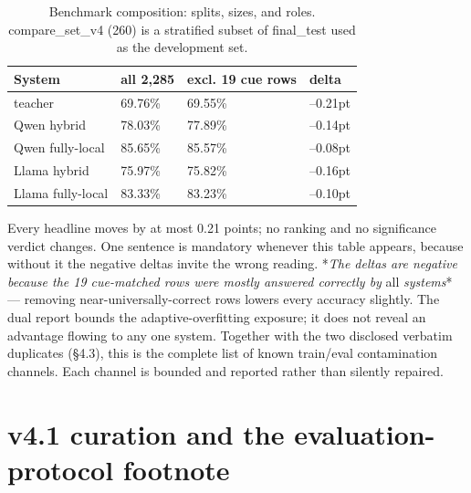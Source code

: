 \documentclass[10pt]{article} %
\begin{document}
\begin{table}[t]
\centering
\small
\caption{Benchmark composition: splits, sizes, and roles. compare\_set\_v4 (260) is a stratified subset of final\_test used as the development set.}
\label{tab:04_benchmark_1}
\begin{tabular}{llll}
\toprule
System & all 2,285 & excl. 19 cue rows & delta \\
\midrule
teacher & 69.76\% & 69.55\% & --0.21pt \\
Qwen hybrid & 78.03\% & 77.89\% & --0.14pt \\
Qwen fully-local & 85.65\% & 85.57\% & --0.08pt \\
Llama hybrid & 75.97\% & 75.82\% & --0.16pt \\
Llama fully-local & 83.33\% & 83.23\% & --0.10pt \\
\bottomrule
\end{tabular}
\end{table}


Every headline moves by at most 0.21 points; no ranking and no significance verdict changes. One sentence is mandatory whenever this table appears, because without it the negative deltas invite the wrong reading. *\emph{The deltas are negative because the 19 cue-matched rows were mostly answered correctly by }all\emph{ systems}* --- removing near-universally-correct rows lowers every accuracy slightly. The dual report bounds the adaptive-overfitting exposure; it does not reveal an advantage flowing to any one system. Together with the two disclosed verbatim duplicates (\S4.3), this is the complete list of known train/eval contamination channels. Each channel is bounded and reported rather than silently repaired.

\section{v4.1 curation and the evaluation-protocol footnote}\label{sec:v4-1-curation-and-the-evaluation-protoco}
\end{document}
